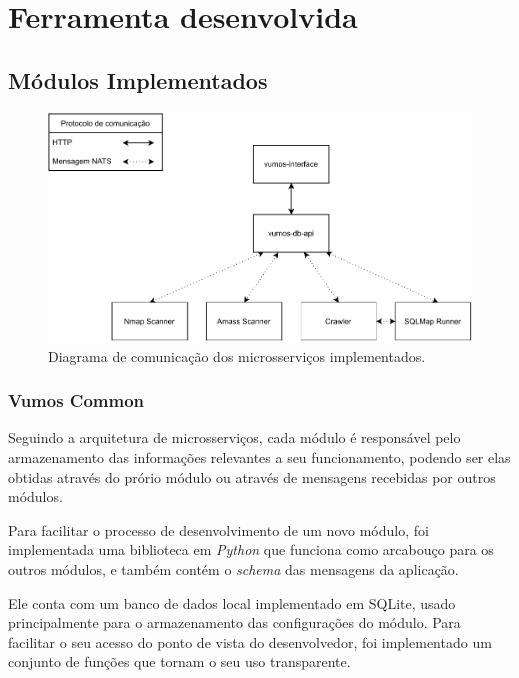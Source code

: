 
\chapter{Ferramenta desenvolvida}
\label{cap:resultados}


\section{Módulos Implementados}

    \begin{figure}[H]
        \includegraphics[scale=0.8]{figuras/vumos-Microservices.pdf}
        \caption{Diagrama de comunicação dos microsserviços implementados.\label{fig:microservices}}
    \end{figure}

    \subsection{Vumos Common}
    Seguindo a arquitetura de microsserviços, cada módulo é responsável pelo armazenamento das informações relevantes a seu funcionamento, podendo ser elas obtidas através do prório módulo ou através de mensagens recebidas por outros módulos. 
    
    Para facilitar o processo de desenvolvimento de um novo módulo, foi implementada uma biblioteca em \textit{Python} que funciona como arcabouço para os outros módulos, e também contém o \textit{schema} das mensagens da aplicação.
    
    Ele conta com um banco de dados local implementado em SQLite, usado principalmente para o armazenamento das configurações do módulo. Para facilitar o seu acesso do ponto de vista do desenvolvedor, foi implementado um conjunto de funções que tornam o seu uso transparente.
    
